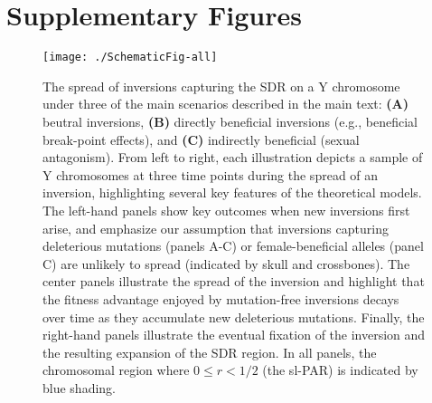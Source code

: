 \documentclass{article}
\begin{document}

 \section{Supplementary Figures} \label{SuppFigs}
 \renewcommand{\theequation}{S\arabic{equation}}
 \setcounter{equation}{0}
 \renewcommand{\thefigure}{S\arabic{figure}}
 \setcounter{figure}{0}

\begin{figure}[htbp]
 \centering
 \texttt{[image: ./SchematicFig-all]}
 \caption{The spread of inversions capturing the SDR on a Y chromosome under three of the main scenarios described in the main text: \textbf{(A)} beutral inversions, \textbf{(B)} directly beneficial inversions (e.g., beneficial break-point effects), and \textbf{(C)} indirectly beneficial (sexual antagonism). From left to right, each illustration depicts a sample of Y chromosomes at three time points during the spread of an inversion, highlighting several key features of the theoretical models. The left-hand panels show key outcomes when new inversions first arise, and emphasize our assumption that inversions capturing deleterious mutations (panels A-C) or female-beneficial alleles (panel C) are unlikely to spread (indicated by skull and crossbones). The center panels illustrate the spread of the inversion and highlight that the fitness advantage enjoyed by mutation-free inversions decays over time as they accumulate new deleterious mutations. Finally, the right-hand panels illustrate the eventual fixation of the inversion and the resulting expansion of the SDR region. In all panels, the chromosomal region where $0 \leq r < 1/2$ (the sl-PAR) is indicated by blue shading.}
 \label{fig:diagramFig}
 \end{figure}
\end{document}
